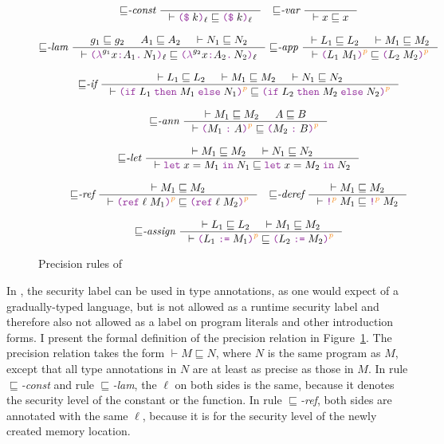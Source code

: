 \begin{figure}[tbp]
  \raggedright
  {\small
  \begin{gather*}
    {\sqsubseteq}\textit{-const}~
    \inference{}{\vdash \const{k}{\ell} \sqsubseteq \const{k}{\ell}}
    \quad
    {\sqsubseteq}\textit{-var}~
    \inference{}{\vdash x \sqsubseteq x}
    \\[2ex]
    {\sqsubseteq}\textit{-lam}~
    \inference{g_1 \sqsubseteq g_2 & A_1 \sqsubseteq A_2 & \vdash N_1 \sqsubseteq N_2 }
              {\vdash \lam{g_1}{x}{A_1}{N_1}{\ell} \sqsubseteq \lam{g_2}{x}{A_2}{N_2}{\ell}}
    \;
    {\sqsubseteq}\textit{-app}~
    \inference{\vdash L_1 \sqsubseteq L_2 & \vdash M_1 \sqsubseteq M_2}
              {\vdash \app{L_1}{M_1}{p} \sqsubseteq \app{L_2}{M_2}{p}}
    \\[2ex]
    {\sqsubseteq}\textit{-if}~
    \inference{\vdash L_1 \sqsubseteq L_2 & \vdash M_1 \sqsubseteq M_2 & \vdash N_1 \sqsubseteq N_2}
              {\vdash \ifexp{L_1}{M_1}{N_1}{p} \sqsubseteq \ifexp{L_2}{M_2}{N_2}{p}}
    \\[2ex]
    {\sqsubseteq}\textit{-ann}~
    \inference{\vdash M_1 \sqsubseteq M_2 & A \sqsubseteq B}
              {\vdash \ann{M_1}{A}{p} \sqsubseteq \ann{M_2}{B}{p}}
    \\[2ex]
    {\sqsubseteq}\textit{-let}~
    \inference{\vdash M_1 \sqsubseteq M_2 & \vdash N_1 \sqsubseteq N_2}
              {\vdash \letexp{x}{M_1}{N_1} \sqsubseteq \letexp{x}{M_2}{N_2}}
    \\[2ex]
    {\sqsubseteq}\textit{-ref}~
    \inference{\vdash M_1 \sqsubseteq M_2}
              {\vdash \refexp{\ell}{M_1}{p} \sqsubseteq \refexp{\ell}{M_2}{p}}
    \quad
    {\sqsubseteq}\textit{-deref}~
    \inference{\vdash M_1 \sqsubseteq M_2}
              {\vdash \deref{M_1}{p} \sqsubseteq \deref{M_2}{p}}
    \\[2ex]
    {\sqsubseteq}\textit{-assign}~
    \inference{\vdash L_1 \sqsubseteq L_2 & \vdash M_1 \sqsubseteq M_2}
              {\vdash \assign{L_1}{M_1}{p} \sqsubseteq \assign{L_2}{M_2}{p}}
  \end{gather*}}
  \caption{Precision rules of \Surface}
  \label{fig:surface-precision}
\end{figure}

In \Surface, the \unk security label can be used in type annotations, as one
would expect of a gradually-typed language, but \unk is not allowed as a runtime
security label and therefore also not allowed as a label on program literals and
other introduction forms. I present the formal definition of the precision
relation in Figure~\ref{fig:surface-precision}. The precision relation takes the
form $\vdash M \sqsubseteq N$, where $N$ is the same \Surface program as $M$,
except that all type annotations in $N$ are at least as precise as those in $M$.
In rule ${\sqsubseteq}$\textit{-const} and rule ${\sqsubseteq}$\textit{-lam},
the $\ell$ on both sides is the same, because it denotes the security level of
the constant or the function. In rule ${\sqsubseteq}$\textit{-ref}, both sides
are annotated with the same $\ell$, because it is for the security level of the
newly created memory location.

